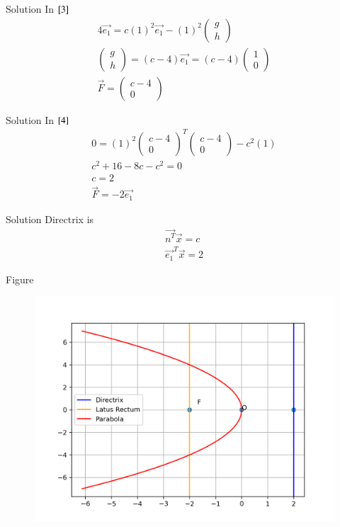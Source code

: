 \documentclass{beamer}
\begin{document}
\begin{frame}{Solution}
In $\eqref{3}$
\begin{align}
    4\vec{e_1}=c(1)^2\vec{e_1}-(1)^2\begin{pmatrix}g\\h\end{pmatrix}\\
    \begin{pmatrix}g\\h\end{pmatrix}=(c-4)\vec{e_1}=(c-4)\begin{pmatrix}1\\0\end{pmatrix}\\
    \vec{F}=\begin{pmatrix}c-4\\0\end{pmatrix}
\end{align}
\end{frame}
\begin{frame}{Solution}
In $\eqref{4}$
\begin{align}
    0=(1)^2\begin{pmatrix}c-4\\0\end{pmatrix}^T\begin{pmatrix}c-4\\0\end{pmatrix}-c^2(1)\\
    c^2+16-8c-c^2=0\\
    c=2\\
    \vec{F}=-2\vec{e_1}
\end{align}
\end{frame}
\begin{frame}{Solution}
Directrix is
\begin{align}
    \vec{n^T}\vec{x}=c\\
    \vec{e_1}^T\vec{x}=2
\end{align}
\end{frame}
\begin{frame}{Figure}
    \begin{figure}[H]
        \centering
        \includegraphics[width=0.9\columnwidth]{figs/figure.png}
        \caption{}
        \label{fig:placeholder}
    \end{figure}
\end{frame}
\end{document}

